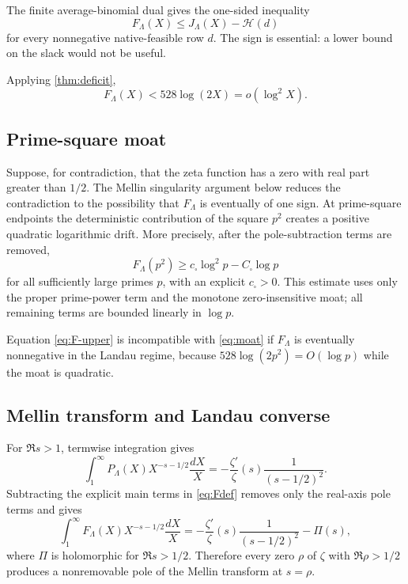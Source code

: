 \documentclass[11pt]{article}
\newcommand{\Jnat}{J_\Lambda}
\newcommand{\Hscore}{\mathcal H}
\begin{document}
The finite average-binomial dual gives the one-sided inequality
\begin{equation}
 \boxed{F_\Lambda(X)\le\Jnat(X)-\Hscore(d)}
 \label{eq:endpoint-dual}
\end{equation}
for every nonnegative native-feasible row $d$. The sign is essential: a lower bound on the slack would not be useful.

Applying \cref{thm:deficit},
\begin{equation}
 F_\Lambda(X)<528\log(2X)=o(\log^2X).
 \label{eq:F-upper}
\end{equation}

\subsection{Prime-square moat}

Suppose, for contradiction, that the zeta function has a zero with real part greater than $1/2$. The Mellin singularity argument below reduces the contradiction to the possibility that $F_\Lambda$ is eventually of one sign. At prime-square endpoints the deterministic contribution of the square $p^2$ creates a positive quadratic logarithmic drift. More precisely, after the pole-subtraction terms are removed,
\begin{equation}
 F_\Lambda(p^2)\ge c_\square\log^2p-C_\square\log p
 \label{eq:moat}
\end{equation}
for all sufficiently large primes $p$, with an explicit $c_\square>0$. This estimate uses only the proper prime-power term and the monotone zero-insensitive moat; all remaining terms are bounded linearly in $\log p$.

Equation \eqref{eq:F-upper} is incompatible with \eqref{eq:moat} if $F_\Lambda$ is eventually nonnegative in the Landau regime, because $528\log(2p^2)=O(\log p)$ while the moat is quadratic.

\subsection{Mellin transform and Landau converse}

For $\Re s>1$, termwise integration gives
\begin{equation}
 \int_1^\infty P_\Lambda(X)X^{-s-1/2}\frac{dX}{X}
 =-\frac{\zeta'}{\zeta}(s)\frac{1}{(s-1/2)^2}.
 \label{eq:mellin-P}
\end{equation}
Subtracting the explicit main terms in \eqref{eq:Fdef} removes only the real-axis pole terms and gives
\begin{equation}
 \int_1^\infty F_\Lambda(X)X^{-s-1/2}\frac{dX}{X}
 =-\frac{\zeta'}{\zeta}(s)\frac{1}{(s-1/2)^2}-\Pi(s),
 \label{eq:mellin-F}
\end{equation}
where $\Pi$ is holomorphic for $\Re s>1/2$. Therefore every zero $\rho$ of $\zeta$ with $\Re\rho>1/2$ produces a nonremovable pole of the Mellin transform at $s=\rho$.
\end{document}
